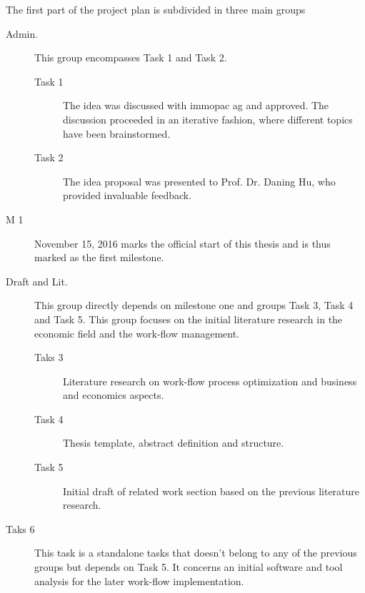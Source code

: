 \documentclass{seal_thesis}
\begin{document}
The first part of the project plan is subdivided in three main groups
\begin{description}
	\item[Admin.] This group encompasses Task 1 and Task 2.
	\begin{description}
		\item[Task 1] The idea was discussed with immopac ag and approved. The discussion proceeded in an iterative fashion, where different topics have been brainstormed.
		\item[Task 2] The idea proposal was presented to Prof. Dr. Daning Hu, who provided invaluable feedback.
	\end{description}
	\item[M 1] November 15, 2016 marks the official start of this thesis and is thus marked as the first milestone.
	\item[Draft and Lit.] This group directly depends on milestone one and groups Task 3, Task 4 and Task 5. This group focuses on the initial literature research in the economic field and the work-flow management.
	\begin{description}
		\item[Taks 3] Literature research on work-flow process optimization and business and economics aspects.
		\item[Task 4] Thesis template, abstract definition and structure.
		\item[Task 5] Initial draft of related work section based on the previous literature research.
	\end{description}
	\item[Taks 6] This task is a standalone tasks that doesn't belong to any of the previous groups but depends on Task 5. It concerns an initial software and tool analysis for the later work-flow implementation.
\end{description}
\end{document}

